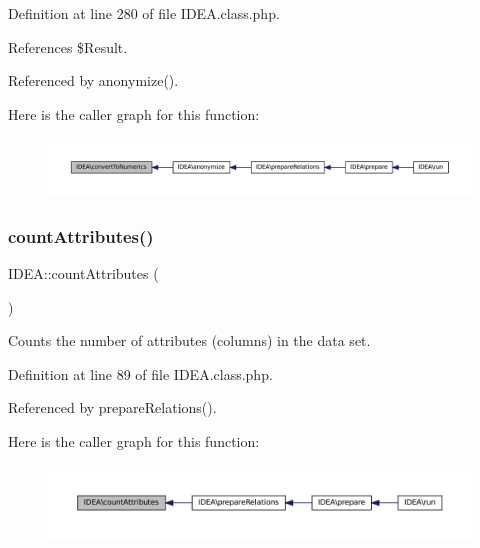 Definition at line 280 of file I\+D\+E\+A.\+class.\+php.



References \$\+Result.



Referenced by anonymize().

Here is the caller graph for this function\+:\nopagebreak
\begin{figure}[H]
\begin{center}
\leavevmode
\includegraphics[width=350pt]{class_i_d_e_a_ac7c5dda1b31f66cb02e09d22d1dbf1e5_icgraph}
\end{center}
\end{figure}
\mbox{\label{class_i_d_e_a_a09cc11c30c9ceafd4a2d74e1cadd96ef}} 
\subsubsection{\texorpdfstring{count\+Attributes()}{countAttributes()}}
{\footnotesize\ttfamily I\+D\+E\+A\+::count\+Attributes (\begin{DoxyParamCaption}{ }\end{DoxyParamCaption})\hspace{0.3cm}{\ttfamily [protected]}}

Counts the number of attributes (columns) in the data set. 

Definition at line 89 of file I\+D\+E\+A.\+class.\+php.



Referenced by prepare\+Relations().

Here is the caller graph for this function\+:\nopagebreak
\begin{figure}[H]
\begin{center}
\leavevmode
\includegraphics[width=350pt]{class_i_d_e_a_a09cc11c30c9ceafd4a2d74e1cadd96ef_icgraph}
\end{center}
\end{figure}
\mbox{\label{class_i_d_e_a_ab64af10966c41b17649bfc1e9ac1fad5}} 
